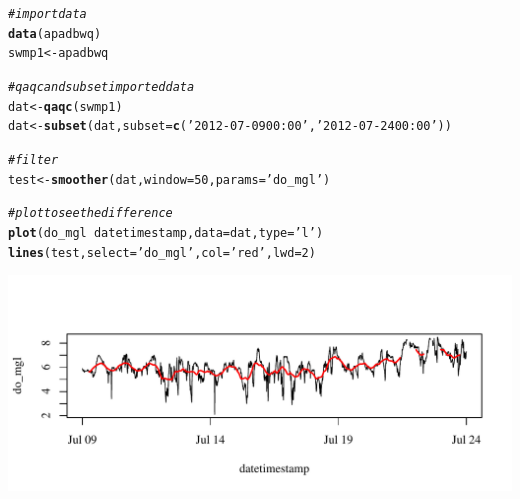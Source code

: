\documentclass[10pt,letterpaper]{article}\usepackage[]{graphicx}\usepackage[]{color}
\makeatletter
\def\maxwidth{ %
  \ifdim\Gin@nat@width>\linewidth
    \linewidth
  \else
    \Gin@nat@width
  \fi
}
\newcommand{\hlnum}[1]{\textcolor[rgb]{0.686,0.059,0.569}{#1}}%
\newcommand{\hlstr}[1]{\textcolor[rgb]{0.192,0.494,0.8}{#1}}%
\newcommand{\hlcom}[1]{\textcolor[rgb]{0.678,0.584,0.686}{\textit{#1}}}%
\newcommand{\hlopt}[1]{\textcolor[rgb]{0,0,0}{#1}}%
\newcommand{\hlstd}[1]{\textcolor[rgb]{0.345,0.345,0.345}{#1}}%
\newcommand{\hlkwb}[1]{\textcolor[rgb]{0.69,0.353,0.396}{#1}}%
\newcommand{\hlkwc}[1]{\textcolor[rgb]{0.333,0.667,0.333}{#1}}%
\newcommand{\hlkwd}[1]{\textcolor[rgb]{0.737,0.353,0.396}{\textbf{#1}}}%
\newenvironment{kframe}{%
 \def\at@end@of@kframe{}%
 \ifinner\ifhmode%
  \def\at@end@of@kframe{\end{minipage}}%
  \begin{minipage}{\columnwidth}%
 \fi\fi%
 \def\FrameCommand##1{\hskip\@totalleftmargin \hskip-\fboxsep
 \colorbox{shadecolor}{##1}\hskip-\fboxsep
     \hskip-\linewidth \hskip-\@totalleftmargin \hskip\columnwidth}%
 \MakeFramed {\advance\hsize-\width
   \@totalleftmargin\z@ \linewidth\hsize
   \@setminipage}}%
 {\par\unskip\endMakeFramed%
 \at@end@of@kframe}
\newenvironment{knitrout}{}{} %
\makeatother
\begin{document}
\begin{knitrout}
\color{fgcolor}\begin{kframe}
\begin{alltt}
\hlcom{# import data}
\hlkwd{data}\hlstd{(apadbwq)}
\hlstd{swmp1} \hlkwb{<-} \hlstd{apadbwq}

\hlcom{# qaqc and subset imported data}
\hlstd{dat} \hlkwb{<-} \hlkwd{qaqc}\hlstd{(swmp1)}
\hlstd{dat} \hlkwb{<-} \hlkwd{subset}\hlstd{(dat,} \hlkwc{subset} \hlstd{=} \hlkwd{c}\hlstd{(}\hlstr{'2012-07-09 00:00'}\hlstd{,} \hlstr{'2012-07-24 00:00'}\hlstd{))}

\hlcom{# filter}
\hlstd{test} \hlkwb{<-} \hlkwd{smoother}\hlstd{(dat,} \hlkwc{window} \hlstd{=} \hlnum{50}\hlstd{,} \hlkwc{params} \hlstd{=} \hlstr{'do_mgl'}\hlstd{)}

\hlcom{# plot to see the difference}
\hlkwd{plot}\hlstd{(do_mgl} \hlopt{~} \hlstd{datetimestamp,} \hlkwc{data} \hlstd{= dat,} \hlkwc{type} \hlstd{=} \hlstr{'l'}\hlstd{)}
\hlkwd{lines}\hlstd{(test,} \hlkwc{select} \hlstd{=} \hlstr{'do_mgl'}\hlstd{,} \hlkwc{col} \hlstd{=} \hlstr{'red'}\hlstd{,} \hlkwc{lwd} \hlstd{=} \hlnum{2}\hlstd{)}
\end{alltt}
\end{kframe}

{\centering \includegraphics[width=\maxwidth]{figure/unnamed-chunk-15} 

}



\end{knitrout}
\end{document}
